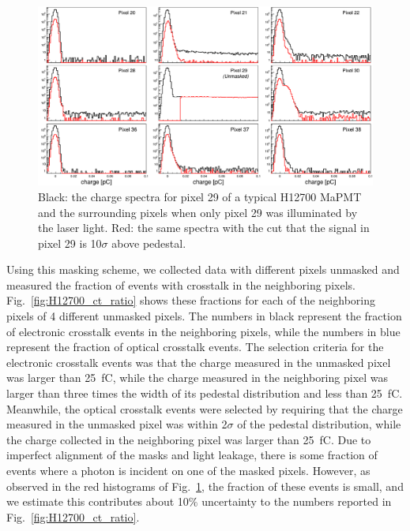 \begin{figure}[h!bt] 
    \centering 
    \includegraphics[width=.9\textwidth,height=0.5\textwidth]{figures/H12700_3mm_mask_config5_ct_updated.png}
    \caption{Black: the charge spectra for pixel 29 of a typical H12700 MaPMT and the surrounding pixels when only pixel 29 was illuminated by the laser light. Red: the same spectra with the cut that the signal in pixel 29 is 10$\sigma$ above pedestal.}
    \label{fig:H12700pinhole}
\end{figure}

Using this masking scheme, we collected data with different pixels unmasked and measured the fraction of events with crosstalk in the neighboring pixels. 
Fig.~\ref{fig:H12700_ct_ratio} shows these fractions for each of the neighboring pixels of 4 different unmasked pixels. The numbers in black represent the fraction of electronic crosstalk events in the neighboring pixels, while the numbers in blue represent the fraction of optical crosstalk events.
The selection criteria for the electronic crosstalk events was that the charge measured in the unmasked pixel was larger than 25~fC, while the charge measured in the neighboring pixel was larger than three times the width of it\textquotesingle s pedestal distribution and less than 25~fC. 
Meanwhile, the optical crosstalk events were selected by requiring that the charge measured in the unmasked pixel was within 2$\sigma$ of the pedestal distribution, while the charge collected in the neighboring pixel was larger than 25~fC. Due to imperfect alignment of the masks and light leakage, there is some fraction of events where a photon is incident on one of the masked pixels. However, as observed in the red histograms of Fig.~\ref{fig:H12700pinhole}, the fraction of these events is small, and we estimate this contributes about 10$\%$ uncertainty to the numbers reported in Fig.~\ref{fig:H12700_ct_ratio}.


